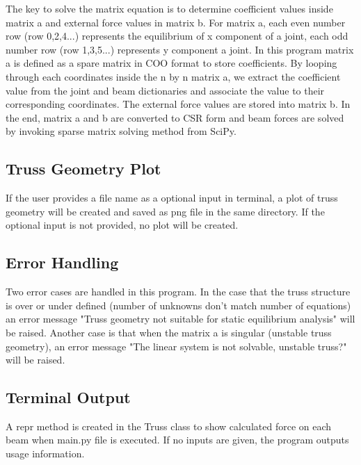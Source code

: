 \documentclass{article}
\begin{document}
The key to solve the matrix equation is to determine coefficient values inside matrix a and external force values in matrix b. For matrix a, each even number row (row 0,2,4...) represents the equilibrium of x component of a joint, each odd number row (row 1,3,5...) represents y component a joint. In this program matrix a is defined as a spare matrix in COO format to store coefficients. By looping through each coordinates inside the n by n matrix a, we extract the coefficient value from the joint and beam dictionaries and associate the value to their corresponding coordinates. The external force values are stored into matrix b. In the end, matrix a and b are converted to CSR form and beam forces are solved by invoking sparse matrix solving method from SciPy.

\subsection{Truss Geometry Plot}
If the user provides a file name as a optional input in terminal, a plot of truss geometry will be created and saved as png file in the same directory. If the optional input is not provided, no plot will be created.

\subsection{Error Handling}
Two error cases are handled in this program. In the case that the truss structure is over or under defined (number of unknowns don't match number of equations) an error message "Truss geometry not suitable for static equilibrium analysis" will be raised. Another case is that when the matrix a is singular (unstable truss geometry), an error message "The linear system is not solvable, unstable truss?" will be raised.

\subsection{Terminal Output}
A repr method is created in the Truss class to show calculated force on each beam when main.py file is executed. If no inputs are given, the program outputs usage information. 
\end{document}
